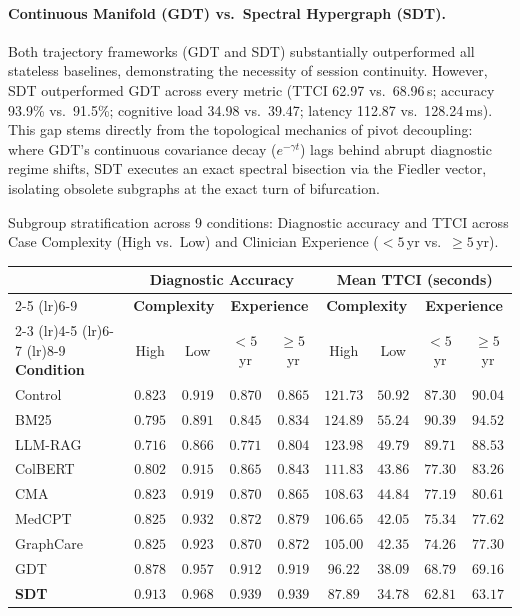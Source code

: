 \documentclass[ijds,dblanonrev]{informs4}
\begin{document}
\paragraph{Continuous Manifold (GDT) vs.\ Spectral Hypergraph (SDT).}
Both trajectory frameworks (GDT and SDT) substantially outperformed all stateless baselines, demonstrating the necessity of session continuity. However, SDT outperformed GDT across every metric (TTCI 62.97 vs.\ 68.96\,s; accuracy 93.9\% vs.\ 91.5\%; cognitive load 34.98 vs.\ 39.47; latency 112.87 vs.\ 128.24\,ms). This gap stems directly from the topological mechanics of pivot decoupling: where GDT's continuous covariance decay ($e^{-\gamma t}$) lags behind abrupt diagnostic regime shifts, SDT executes an exact spectral bisection via the Fiedler vector, isolating obsolete subgraphs at the exact turn of bifurcation.

\begin{table}[t]
\TABLE
{Subgroup stratification across 9 conditions: Diagnostic accuracy and TTCI across Case Complexity (High vs.\ Low) and Clinician Experience ($<5$\,yr vs.\ $\ge 5$\,yr).\label{tab:subgroup_results}}
{\small
\begin{tabular}{lcccccccc}
\toprule
& \multicolumn{4}{c}{\textbf{Diagnostic Accuracy}} & \multicolumn{4}{c}{\textbf{Mean TTCI (seconds)}} \\
\cmidrule(lr){2-5} \cmidrule(lr){6-9}
& \multicolumn{2}{c}{\textbf{Complexity}} & \multicolumn{2}{c}{\textbf{Experience}} & \multicolumn{2}{c}{\textbf{Complexity}} & \multicolumn{2}{c}{\textbf{Experience}} \\
\cmidrule(lr){2-3} \cmidrule(lr){4-5} \cmidrule(lr){6-7} \cmidrule(lr){8-9}
\textbf{Condition} & High & Low & $<5$\,yr & $\ge 5$\,yr & High & Low & $<5$\,yr & $\ge 5$\,yr \\
\midrule
Control   & $0.823$ & $0.919$ & $0.870$ & $0.865$ & $121.73$ & $50.92$ & $87.30$ & $90.04$ \\
BM25      & $0.795$ & $0.891$ & $0.845$ & $0.834$ & $124.89$ & $55.24$ & $90.39$ & $94.52$ \\
LLM-RAG   & $0.716$ & $0.866$ & $0.771$ & $0.804$ & $123.98$ & $49.79$ & $89.71$ & $88.53$ \\
ColBERT   & $0.802$ & $0.915$ & $0.865$ & $0.843$ & $111.83$ & $43.86$ & $77.30$ & $83.26$ \\
CMA       & $0.823$ & $0.919$ & $0.870$ & $0.865$ & $108.63$ & $44.84$ & $77.19$ & $80.61$ \\
MedCPT    & $0.825$ & $0.932$ & $0.872$ & $0.879$ & $106.65$ & $42.05$ & $75.34$ & $77.62$ \\
GraphCare & $0.825$ & $0.923$ & $0.870$ & $0.872$ & $105.00$ & $42.35$ & $74.26$ & $77.30$ \\
GDT       & $0.878$ & $0.957$ & $0.912$ & $0.919$ & $96.22$  & $38.09$ & $68.79$ & $69.16$ \\
\midrule
\textbf{SDT} & $\mathbf{0.913}$ & $\mathbf{0.968}$ & $\mathbf{0.939}$ & $\mathbf{0.939}$ & $\mathbf{87.89}$ & $\mathbf{34.78}$ & $\mathbf{62.81}$ & $\mathbf{63.17}$ \\
\bottomrule
\end{tabular}
}
{}
\end{table}
\end{document}
